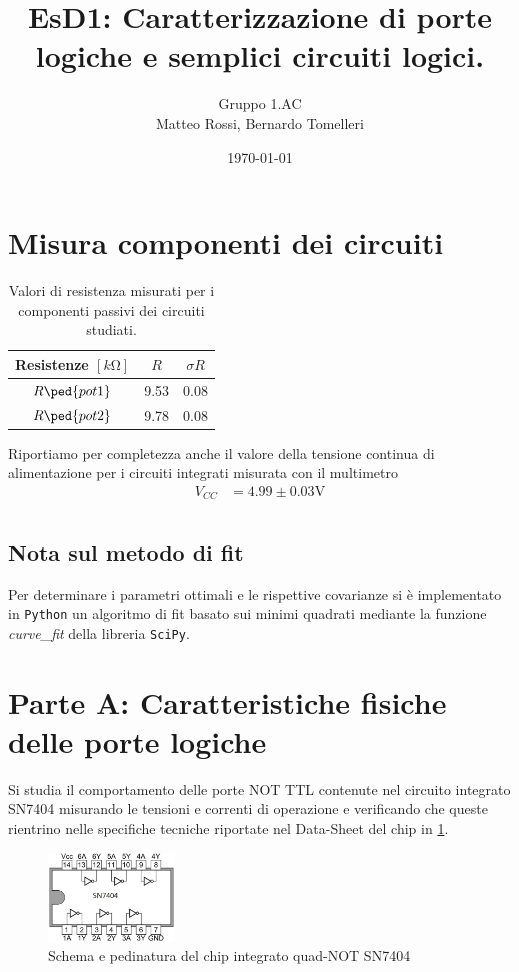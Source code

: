 \documentclass[10pt, a4paper, italian]{article}
\author{Gruppo 1.AC \\ Matteo Rossi, Bernardo Tomelleri}
\title{EsD1: Caratterizzazione di porte logiche e semplici circuiti logici.}
\begin{document}
\date{\today}
\maketitle

\section*{Misura componenti dei circuiti}
\begin{table}[htbp]
\centering
\begin{tabular}{ccc}
\toprule
Resistenze $[k \si{\ohm}]$ & $R$ & $\sigma R$ \\
\midrule
\midrule
$R\ped{pot1}$	& 9.53	& 0.08 		\\
$R\ped{pot2}$	& 9.78	& 0.08		\\
\bottomrule
\end{tabular}
\caption{Valori di resistenza misurati per i componenti passivi dei circuiti
studiati. \label{tab: rmesM}}
\end{table}

Riportiamo per completezza anche il valore della tensione continua di
alimentazione per i circuiti integrati misurata con il multimetro
\begin{align*}
V_{CC} &= 4.99 \pm 0.03 \si{\V} \\
\end{align*}

\subsection*{Nota sul metodo di fit}
Per determinare i parametri ottimali e le rispettive covarianze si \`e
implementato in \verb+Python+ un algoritmo di fit basato sui minimi quadrati
mediante la funzione \emph{curve\_fit} della libreria \texttt{SciPy}.

\setcounter{section}{0}
\section*{Parte A: Caratteristiche fisiche delle porte logiche}
Si studia il comportamento delle porte NOT TTL contenute nel circuito
integrato SN7404 misurando le tensioni e correnti di operazione e verificando
che queste rientrino nelle specifiche tecniche riportate nel Data-Sheet del
chip in \cref{fig: SN7404}.
\begin{figure}[htbp]
\centering
    \includegraphics[width=0.3\textwidth]{SN7404}
    \caption{Schema e pedinatura del chip integrato
    quad-NOT SN7404 \label{fig: SN7404}}
\end{figure}
\end{document}
